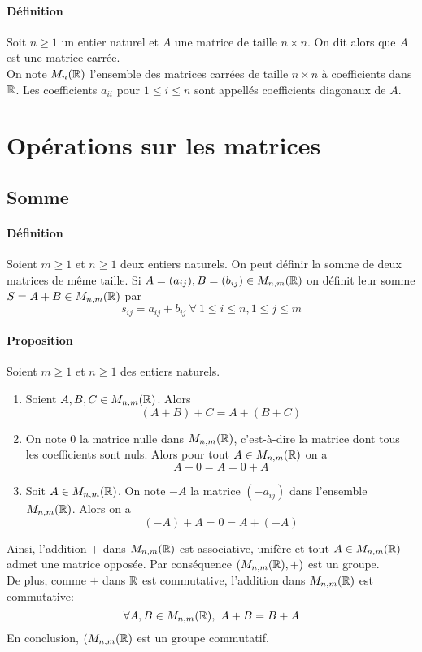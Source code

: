\paragraph{Définition} Soit $n \geq 1$ un entier naturel et $A$ une matrice de taille $n\times n$. On dit alors que $A$ est une matrice carrée. \\ 
On note $M_{n}(\mathbb{R})$ l'ensemble des matrices carrées de taille $n\times n$ à coefficients dans $\mathbb{R}$. Les coefficients $a_{ii}$ pour $1 \leq i \leq n$ sont appellés coefficients diagonaux de $A$.

%
%
\section{Opérations sur les matrices}
%
%

%
\subsection{Somme}
%
\paragraph{Définition} Soient $m\geq 1$ et $n \geq 1$ deux entiers naturels. On peut définir la somme de deux matrices de même taille. Si $A = (a_{ij}), B = (b_{ij}) \in M_{n, m}(\mathbb{R})$ on définit leur somme $S = A + B \in M_{n, m}(\mathbb{R})$ par
$$s_{ij} = a_{ij} + b_{ij} ~ \forall ~ 1 \leq i \leq n, 1 \leq j \leq m$$

\paragraph{Proposition} Soient $m \geq 1$ et $n\geq 1$ des entiers naturels.
\begin{enumerate}
  \item Soient $A, B, C \in M_{n, m}(\mathbb{R})$. Alors
    $$(A + B) + C = A + (B + C)$$
  \item On note $0$ la matrice nulle dans $M_{n, m}(\mathbb{R})$, c'est-à-dire la matrice dont tous les coefficients sont nuls. Alors pour tout $A \in M_{n, m}(\mathbb{R})$ on a
    $$A + 0 = A = 0 + A$$
  \item Soit $A \in M_{n, m}(\mathbb{R})$. On note $-A$ la matrice $(-a_{ij})$ dans l'ensemble $M_{n, m}(\mathbb{R})$. Alors on a
    $$(-A) + A = 0 = A + (-A)$$
\end{enumerate}
Ainsi, l'addition $+$ dans $M_{n, m}(\mathbb{R})$ est associative, unifère et tout $A \in M_{n, m}(\mathbb{R})$ admet une matrice opposée. Par conséquence $(M_{n, m}(\mathbb{R}), +)$ est un groupe.\\
De plus, comme $+$ dans $\mathbb{R}$ est commutative, l'addition dans $M_{n,m}(\mathbb{R})$ est commutative:
$$\forall A, B \in M_{n, m}(\mathbb{R}), ~ A + B = B + A$$
En conclusion, $(M_{n, m}(\mathbb{R})$ est un groupe commutatif.

